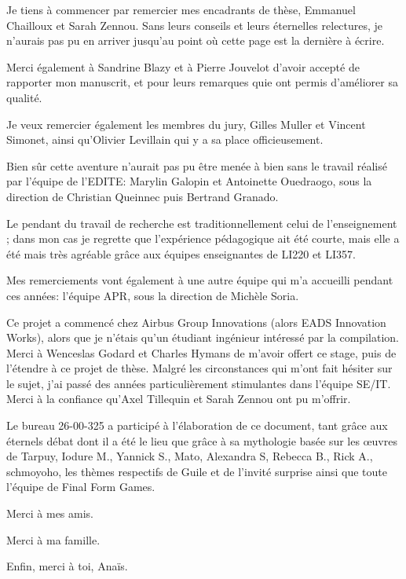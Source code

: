 

Je tiens à commencer par remercier mes encadrants de thèse, Emmanuel Chailloux
et Sarah Zennou. Sans leurs conseils et leurs éternelles relectures, je n'aurais
pas pu en arriver jusqu'au point où cette page est la dernière à écrire.


Merci également à Sandrine Blazy et à Pierre Jouvelot d'avoir accepté de
rapporter mon manuscrit, et pour leurs remarques quie ont permis d'améliorer sa
qualité.


Je veux remercier également les membres du jury, Gilles Muller et Vincent
Simonet, ainsi qu'Olivier Levillain qui y a sa place officieusement.


Bien sûr cette aventure n'aurait pas pu être menée à bien sans le travail
réalisé par l'équipe de l'EDITE: Marylin Galopin et Antoinette Ouedraogo, sous
la direction de Christian Queinnec puis Bertrand Granado.


Le pendant du travail de recherche est traditionnellement celui de
l'enseignement ; dans mon cas je regrette que l'expérience pédagogique ait été
courte, mais elle a été mais très agréable grâce aux équipes enseignantes de
LI220 et LI357.


Mes remerciements vont également à une autre équipe qui m'a accueilli pendant
ces années: l'équipe APR, sous la direction de Michèle Soria.



Ce projet a commencé chez Airbus Group Innovations (alors EADS Innovation
Works), alors que je n'étais qu'un étudiant ingénieur intéressé par la
compilation. Merci à Wenceslas Godard et Charles Hymans de m'avoir offert ce
stage, puis de l'étendre à ce projet de thèse. Malgré les circonstances qui
m'ont fait hésiter sur le sujet, j'ai passé des années particulièrement
stimulantes dans l'équipe SE/IT. Merci à la confiance qu'Axel Tillequin et Sarah
Zennou ont pu m'offrir.


Le bureau 26-00-325 a participé à l'élaboration de ce document, tant grâce aux
éternels débat dont il a été le lieu que grâce à sa mythologie basée sur les
œuvres de Tarpuy, Iodure M., Yannick S., Mato, Alexandra S, Rebecca B., Rick A.,
schmoyoho, les thèmes respectifs de Guile et de l'invité surprise ainsi que
toute l'équipe de Final Form Games.




Merci à mes amis.


Merci à ma famille.


Enfin, merci à toi, Anaïs.
